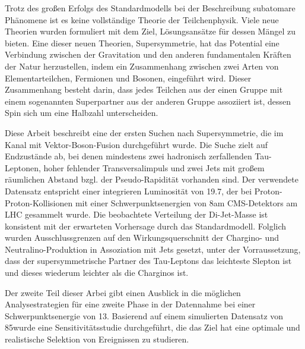 Trotz des gro{\ss}en Erfolgs des Standardmodells bei der Beschreibung subatomare Ph\"anomene ist es keine vollst\"andige Theorie der Teilchenphysik. Viele neue Theorien wurden formuliert mit dem Ziel, Lösungsans\"atze f\"ur dessen M\"angel zu bieten.
Eine dieser neuen Theorien, Supersymmetrie, hat das Potential eine Verbindung zwischen der Gravitation und den anderen fundamentalen Kr\"aften der Natur herzustellen, indem ein Zusammenhang zwischen zwei Arten von Elementarteilchen, Fermionen und Bosonen, eingef\"uhrt wird. Dieser Zusammenhang besteht darin, dass jedes Teilchen aus der einen Gruppe mit einem sogenannten Superpartner aus der anderen Gruppe assoziiert ist, dessen Spin sich um eine Halbzahl unterscheiden.

Diese Arbeit beschreibt eine der ersten Suchen nach Supersymmetrie, die im Kanal mit Vektor-Boson-Fusion durchgef\"uhrt wurde. Die Suche zielt auf Endzust\"ande ab, bei denen mindestens zwei hadronisch zerfallenden Tau-Leptonen, hoher fehlender Transversalimpuls und zwei Jets mit gro{\ss}em r\"aumlichen Abstand bzgl. der Pseudo-Rapidit\"at vorhanden sind. Der verwendete Datensatz entspricht einer integrieren Luminosit\"at von 19.7\invfb, der bei Proton-Proton-Kollisionen mit einer Schwerpunktsenergien von 8\tev am CMS-Detektors am LHC gesammelt wurde. Die beobachtete Verteilung der Di-Jet-Masse ist konsistent mit der erwarteten Vorhersage durch das Standardmodell. Folglich wurden Ausschlussgrenzen auf den Wirkungsquerschnitt der Chargino- und Neutralino-Produktion in Assoziation mit Jets gesetzt, unter der Vorraussetzung, dass der supersymmetrische Partner des Tau-Leptons das leichteste Slepton ist und dieses wiederum leichter als die Charginos ist.

Der zweite Teil dieser Arbei gibt einen Ausblick in die m\"oglichen Analysestrategien f\"ur eine zweite Phase in der Datennahme bei einer Schwerpunktsenergie von 13\tev. Basierend auf einem simulierten Datensatz von 85\invfb wurde eine Sensitivit\"atsstudie durchgef\"uhrt, die das Ziel hat eine optimale und realistische Selektion von Ereignissen zu studieren.
